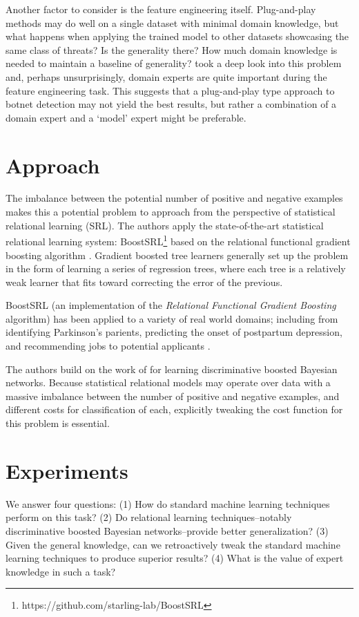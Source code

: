 \documentclass[letterpaper]{article}
\begin{document}
Another factor to consider is the feature engineering itself.  Plug-and-play methods may do well on a single dataset with minimal domain knowledge, but what happens when applying the trained model to other datasets showcasing the same class of threats?  Is the generality there?  How much domain knowledge is needed to maintain a baseline of generality?  \cite{BENASHER201551} took a deep look into this problem and, perhaps unsurprisingly, domain experts are quite important during the feature engineering task.  This suggests that a plug-and-play type approach to botnet detection may not yield the best results, but rather a combination of a domain expert and a `model' expert might be preferable.

\section{Approach}

The imbalance between the potential number of positive and negative examples makes this a potential problem to approach from the perspective of statistical relational learning (SRL).  The authors apply the state-of-the-art statistical relational learning system: BoostSRL\footnote{https://github.com/starling-lab/BoostSRL} based on the relational functional gradient boosting algorithm \cite{natarajan2015boosted}.  Gradient boosted tree learners generally set up the problem in the form of learning a series of regression trees, where each tree is a relatively weak learner that fits toward correcting the error of the previous.

BoostSRL (an implementation of the \textit{Relational Functional Gradient Boosting} algorithm) has been applied to a variety of real world domains; including from identifying Parkinson's parients, predicting the onset of postpartum depression, and recommending jobs to potential applicants \cite{dhami2017identifying,natarajan2017boosting,yang2017combining}.

The authors build on the work of \cite{ramanan2017discriminative,yang2014learning} for learning discriminative boosted Bayesian networks.  Because statistical relational models may operate over data with a massive imbalance between the number of positive and negative examples, and different costs for classification of each, explicitly tweaking the cost function for this problem is essential.

\section{Experiments}
We answer four questions: (1) How do standard machine learning techniques perform on this task? (2) Do relational learning techniques--notably discriminative boosted Bayesian networks--provide better generalization? (3) Given the general knowledge, can we retroactively tweak the standard machine learning techniques to produce superior results? (4) What is the value of expert knowledge in such a task?
\end{document}
